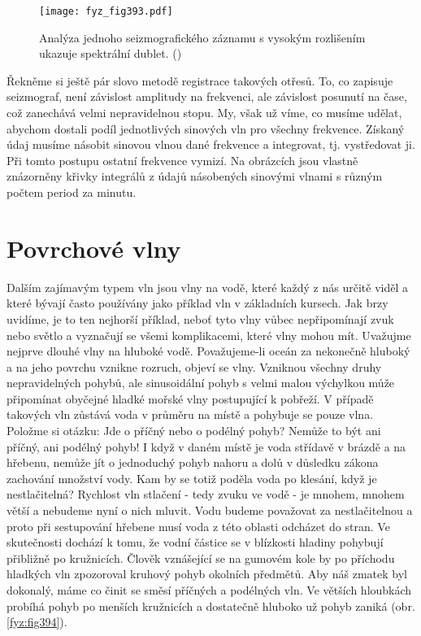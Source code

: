   \begin{figure}[ht!] %
    \centering
    \texttt{[image: fyz\_fig393.pdf]}
    \caption{Analýza jednoho seizmografického záznamu s vysokým rozlišením ukazuje spektrální 
             dublet.
             (\cite[s.~694]{Feynman01})}
    \label{fyz:fig393}
  \end{figure}
  
  Řekněme si ještě pár slovo metodě registrace takových otřesů. To, co zapisuje seizmograf, není 
  závislost amplitudy na frekvenci, ale závislost posunutí na čase, což zanechává velmi 
  nepravidelnou stopu. My, však už víme, co musíme udělat, abychom dostali podíl jednotlivých 
  sinových vln pro všechny frekvence. Získaný údaj musíme násobit sinovou vlnou dané frekvence a 
  integrovat, tj. vystředovat ji. Při tomto postupu ostatní frekvence vymizí. Na obrázcích jsou 
  vlastně znázorněny křivky integrálů z údajů násobených sinovými vlnami s různým počtem period za 
  minutu.
  
\section{Povrchové vlny}\label{fyz:IchapLIsecIV}
  Dalším zajímavým typem vln jsou vlny na vodě, které každý z nás určitě viděl a které bývají často 
  používány jako příklad vln v základních kursech. Jak brzy uvidíme, je to ten nejhorší příklad, 
  neboť tyto vlny vůbec nepřipomínají zvuk nebo světlo a vyznačují se všemi komplikacemi, které 
  vlny mohou mít. Uvažujme nejprve dlouhé vlny na hluboké vodě. Považujeme-li oceán za nekonečně 
  hluboký a na jeho povrchu vznikne rozruch, objeví se vlny. Vzniknou všechny druhy nepravidelných 
  pohybů, ale sinusoidální pohyb s velmi malou výchylkou může připomínat obyčejné hladké mořské 
  vlny postupující k pobřeží. V případě takových vln zůstává voda v průměru na místě a pohybuje se 
  pouze vlna. Položme si otázku: Jde o příčný nebo o podélný pohyb? Nemůže to být ani příčný, ani 
  podélný pohyb! I když v daném místě je voda střídavě v brázdě a na hřebenu, nemůže jít o 
  jednoduchý pohyb nahoru a dolů v důsledku zákona zachování množství vody. Kam by se totiž poděla 
  voda po klesání, když je nestlačitelná? Rychlost vln stlačení - tedy zvuku ve vodě - je mnohem, 
  mnohem větší a nebudeme nyní o nich mluvit. Vodu budeme považovat za nestlačitelnou a proto při 
  sestupování hřebene musí voda z této oblasti odcházet do stran. Ve skutečnosti dochází k tomu, že 
  vodní částice se v blízkosti hladiny pohybují přibližně po kružnicích. Člověk vznášející se 
  na gumovém kole by po příchodu hladkých vln zpozoroval kruhový pohyb okolních předmětů. Aby náš 
  zmatek byl dokonalý, máme co činit se směsí příčných a podélných vln. Ve větších hloubkách 
  probíhá pohyb po menších kružnicích a dostatečně hluboko už pohyb zaniká (obr. \ref{fyz:fig394}).
  
